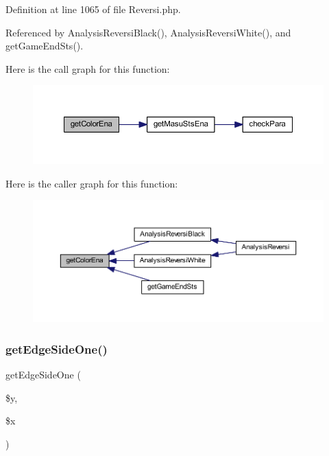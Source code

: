 Definition at line 1065 of file Reversi.\+php.



Referenced by Analysis\+Reversi\+Black(), Analysis\+Reversi\+White(), and get\+Game\+End\+Sts().

Here is the call graph for this function\+:\nopagebreak
\begin{figure}[H]
\begin{center}
\leavevmode
\includegraphics[width=350pt]{class_reversi_aead5ee041feb6ac2609266614ea06f78_cgraph}
\end{center}
\end{figure}
Here is the caller graph for this function\+:\nopagebreak
\begin{figure}[H]
\begin{center}
\leavevmode
\includegraphics[width=350pt]{class_reversi_aead5ee041feb6ac2609266614ea06f78_icgraph}
\end{center}
\end{figure}
\mbox{\label{class_reversi_a98aff7f2db3a9feacbe98293c6b80eb4}} 
\subsubsection{\texorpdfstring{get\+Edge\+Side\+One()}{getEdgeSideOne()}}
{\footnotesize\ttfamily get\+Edge\+Side\+One (\begin{DoxyParamCaption}\item[{}]{\$y,  }\item[{}]{\$x }\end{DoxyParamCaption})}



